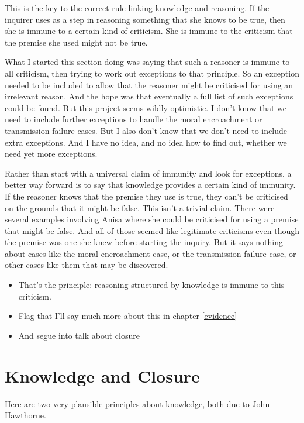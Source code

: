 \documentclass[11pt,]{book}
\providecommand{\tightlist}{%
  \setlength{\itemsep}{0pt}\setlength{\parskip}{0pt}}
\begin{document}
This is the key to the correct rule linking knowledge and reasoning. If the inquirer uses as a step in reasoning something that she knows to be true, then she is immune to a certain kind of criticism. She is immune to the criticism that the premise she used might not be true.

What I started this section doing was saying that such a reasoner is immune to all criticism, then trying to work out exceptions to that principle. So an exception needed to be included to allow that the reasoner might be criticised for using an irrelevant reason. And the hope was that eventually a full list of such exceptions could be found. But this project seems wildly optimistic. I don't know that we need to include further exceptions to handle the moral encroachment or transmission failure cases. But I also don't know that we don't need to include extra exceptions. And I have no idea, and no idea how to find out, whether we need yet more exceptions.

Rather than start with a universal claim of immunity and look for exceptions, a better way forward is to say that knowledge provides a certain kind of immunity. If the reasoner knows that the premise they use is true, they can't be criticised on the grounds that it might be false. This isn't a trivial claim. There were several examples involving Anisa where she could be criticised for using a premise that might be false. And all of those seemed like legitimate criticisms even though the premise was one she knew before starting the inquiry. But it says nothing about cases like the moral encroachment case, or the transmission failure case, or other cases like them that may be discovered.

\begin{itemize}
\tightlist
\item
  That's the principle: reasoning structured by knowledge is immune to this criticism.
\item
  Flag that I'll say much more about this in chapter \ref{evidence}
\item
  And segue into talk about closure
\end{itemize}

\hypertarget{knowledge-and-closure}{%
\section{Knowledge and Closure}\label{knowledge-and-closure}}

Here are two very plausible principles about knowledge, both due to John Hawthorne.
\end{document}
